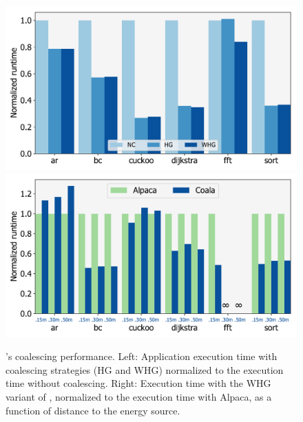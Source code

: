 \begin{figure}
	\includegraphics[width=0.5\columnwidth]{figures/coalStrategies}%
	\includegraphics[width=0.5\columnwidth]{figures/coala_alpaca_gcc}
    \caption{\sys's coalescing performance. Left: Application execution time
with coalescing strategies (HG and WHG) normalized to the execution time
without coalescing. Right: Execution time with the WHG variant of \sys,
normalized to the execution time with Alpaca, as a function of distance to the
energy source.}
	\label{fig:coalescing}
	\label{fig:runtime}
\end{figure}

%

